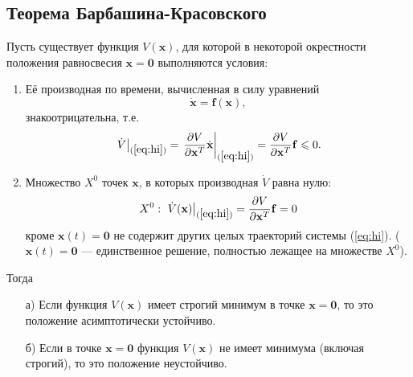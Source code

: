 \documentclass[a4paper]{article}
\begin{document}
\subsection{Теорема Барбашина-Красовского}
\begin{thm}
	Пусть существует функция $V(\mathbf{x})$, для которой в некоторой окрестности
	положения равносвесия $\mathbf{x}=\mathbf{0}$ выполняются условия:
	\begin{enumerate}
		\item Её производная по времени, вычисленная в силу уравнений
			\[
				\dot{\mathbf{x}}=\mathbf{f}(\mathbf{x}) \tag{*}
				\label{eq:hi}
			,\]
		знакоотрицательна, т.\:е.
		\[
			\left. \dot{V}  \right|_{(\ref{eq:hi})}=
			\left.\frac{\partial V}{\partial \mathbf{x}^T} \dot{\mathbf{x}}
			\right|_{(\ref{eq:hi})}=\frac{\partial V}{\partial  \mathbf{x}^T}
			\mathbf{f}\le 0
		.\]
		\item Множество $X^0$ точек  $\mathbf{x}$, в которых
			производная $\dot{V}$ равна нулю:
 \[
	 X^0:\: \left.\dot{V}(\mathbf{x})\right|_{(\ref{eq:hi})}=
		 \frac{\partial V}{\partial \mathbf{x}^T}\mathbf{f}=0 
 \]
 кроме $\mathbf{x}(t)=\mathbf{0}$ не содержит других целых траекторий системы
 (\ref{eq:hi}). ($\mathbf{x}(t)=\mathbf{0}$ --- единственное решение, полностью
 лежащее на множестве $X^0$).
	\end{enumerate}
	Тогда
	\begin{itemize}
		\item[а)] Если функция $V(\mathbf{x})$ имеет строгий минимум в
			точке $\mathbf{x}=\mathbf{0}$, то это положение
			асимптотически устойчиво.
		\item[б)] Если в точке $\mathbf{x}=\mathbf{0}$ функция
				$V(\mathbf{x})$ не имеет минимума (включая
				строгий), то это положение неустойчиво.
	\end{itemize}
\end{thm}
\end{document}
